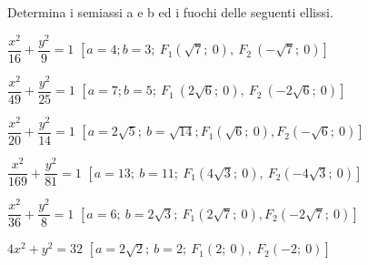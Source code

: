 \begin{esercizio}
  \label{ese:div.003}
  Determina i semiassi a e b ed i fuochi delle seguenti ellissi.
  \begin{enumeratea}
    \item $\dfrac{x^{2}}{16} + \dfrac{y^{2}}{9} =1$ 
    \hfill
      $\left[a=4; b=3;~F_{1} \left( 
\sqrt{7};~0\right),~F_{2}~\left(- \sqrt{7};~0\right)\right]$
    \item $ \dfrac{x^{2}}{49} + \dfrac{y^{2}}{25} =1$  
    \hfill
      $\left[a=7; b=5;~F_{1}~\left(2 
\sqrt{6};~0\right),~F_{2}~\left(-2 \sqrt{6};~0\right)\right]$
      \item $ \dfrac{x^{2}}{20} + \dfrac{y^{2}}{14} =1$
      \hfill $\left[a=2 \sqrt{5} ;~ b= \sqrt{14} ;  F_{1}  
\left(\sqrt{6} ;~ 0\right),  F_{2}  \left(-\sqrt{6} ;~0\right)\right]$
      \item $ \dfrac{x^{2}}{169} + \dfrac{y^{2}}{81} =1$
      \hfill $\left[a=13 ;~b=11 ;~F_{1}  \left(4 \sqrt{3} 
;~0\right),~F_{2}  \left(-4 \sqrt{3} ;~0\right)\right]$
      \item $ \dfrac{x^{2}}{36} + \dfrac{y^{2}}{8} =1$
      \hfill $\left[a=6 ;~b=2 \sqrt{3}  ;~F_{1}  \left(2 \sqrt{7} 
;~0\right),  F_{2}  \left(-2 \sqrt{7} ;~0\right)\right]$
      
      \item  $4 {x^{2}} +{y^{2}} =32$
      \hfill $\left[a=2 \sqrt{2}  ;~b=2 ;  ~F_{1}  (2;~0), ~ F_{2}  
(-2;~ 0)\right]$
  \end{enumeratea}
\end{esercizio}

